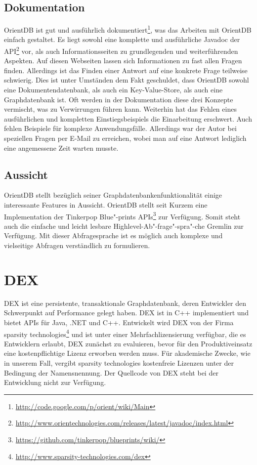 \documentclass[11pt, a4paper, oneside]{article} %
\begin{document}
\subsection{Dokumentation}

OrientDB ist gut und ausführlich dokumentiert\footnote{\url{http://code.google.com/p/orient/wiki/Main}}, was das Arbeiten mit OrientDB einfach gestaltet. Es liegt sowohl eine komplette und ausführliche Javadoc der API\footnote{\url{http://www.orientechnologies.com/releases/latest/javadoc/index.html}} vor, als auch Informationsseiten zu grundlegenden und weiterführenden Aspekten. Auf diesen Webseiten lassen sich Informationen zu fast allen Fragen finden. Allerdings ist das Finden einer Antwort auf eine konkrete Frage teilweise schwierig. Dies ist unter Umständen dem Fakt geschuldet, dass OrientDB sowohl eine Dokumentendatenbank, als auch ein Key-Value-Store, als auch eine Graphdatenbank ist. Oft werden in der Dokumentation diese drei Konzepte vermischt, was zu Verwirrungen führen kann. Weiterhin hat das Fehlen eines ausführlichen und kompletten Einstiegsbeispiels die Einarbeitung erschwert. Auch fehlen Beispiele für komplexe Anwendungsfälle. Allerdings war der Autor bei speziellen Fragen per E-Mail zu erreichen, wobei man auf eine Antwort lediglich eine angemessene Zeit warten musste.

\subsection{Aussicht}

OrientDB stellt bezüglich seiner Graphdatenbankenfunktionalität einige interessante Features in Aussicht. OrientDB stellt seit Kurzem eine Implementation der Tinkerpop Blue"-prints APIs\footnote{\url{https://github.com/tinkerpop/blueprints/wiki/}} zur Verfügung. Somit steht auch die einfache und leicht lesbare Highlevel-Ab"-frage"-spra"-che Gremlin zur Verfügung. Mit dieser Abfragesprache ist es möglich auch komplexe und vielseitige Abfragen verständlich zu formulieren.

\section{DEX}

DEX ist eine persistente, transaktionale Graphdatenbank, deren Entwickler den Schwerpunkt auf Performance gelegt haben. DEX ist in C++ implementiert und bietet APIs für Java, .NET und C++. Entwickelt wird DEX von der Firma sparsity technologies\footnote{\url{http://www.sparsity-technologies.com/dex}} und ist unter einer Mehrfachlizensierung verfügbar, die es Entwicklern erlaubt, DEX zunächst zu evaluieren, bevor für den Produktiveinsatz eine kostenpflichtige Lizenz erworben werden muss. Für akademische Zwecke, wie in unserem Fall, vergibt sparsity technologies kostenfreie Lizenzen unter der Bedingung der Namensnennung. Der Quellcode von DEX steht bei der Entwicklung nicht zur Verfügung.
\end{document}
